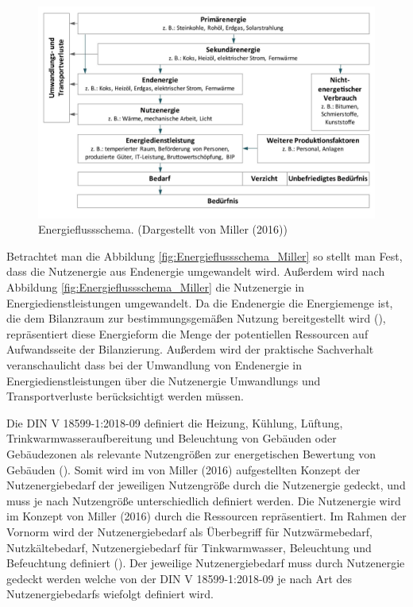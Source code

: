 \begin{figure}[H]
    \centering
    \includegraphics[width=1\textwidth]{../../Ressourcen/Abbildungen/Energiefluss_Miller.jpg}
    \caption{Energieflussschema. (Dargestellt von Miller (2016))}
    \label{fig:Energieflussschema_Miller}
\end{figure}

Betrachtet man die Abbildung \eqref{fig:Energieflussschema_Miller} so stellt man Fest, dass die Nutzenergie aus Endenergie umgewandelt wird. 
Außerdem wird nach Abbildung \eqref{fig:Energieflussschema_Miller} die Nutzenergie in Energiedienstleistungen umgewandelt. 
Da die Endenergie die Energiemenge ist, die dem Bilanzraum zur bestimmungsgemäßen Nutzung bereitgestellt wird (\cite[Kapitel 3.1.2]{DIN18599.2018}), 
repräsentiert diese Energieform die Menge der potentiellen Ressourcen auf Aufwandsseite der Bilanzierung.
Außerdem wird der praktische Sachverhalt veranschaulicht dass bei der Umwandlung von Endenergie in Energiedienstleistungen über die Nutzenergie 
Umwandlungs und Transportverluste berücksichtigt werden müssen.

Die DIN V 18599-1:2018-09 definiert die Heizung, Kühlung, Lüftung, Trinkwarmwasseraufbereitung und Beleuchtung von Gebäuden oder Gebäudezonen 
als relevante Nutzengrößen zur energetischen Bewertung von Gebäuden (\cite{DIN18599.2018}). 
Somit wird im von Miller (2016) aufgestellten Konzept der Nutzenergiebedarf der jeweiligen Nutzengröße durch die Nutzenergie gedeckt, 
und muss je nach Nutzengröße unterschiedlich definiert werden. Die Nutzenergie wird im Konzept von Miller (2016) durch die Ressourcen repräsentiert.
Im Rahmen der Vornorm wird der Nutzenergiebedarf als Überbegriff für Nutzwärmebedarf, Nutzkältebedarf, Nutzenergiebedarf für Tinkwarmwasser, Beleuchtung und 
Befeuchtung definiert (\cite[Kapitel 3.1.3]{DIN18599.2018}). 
Der jeweilige Nutzenergiebedarf muss durch Nutzenergie gedeckt werden welche von der DIN V 18599-1:2018-09 je nach Art des Nutzenergiebedarfs wiefolgt definiert wird.

